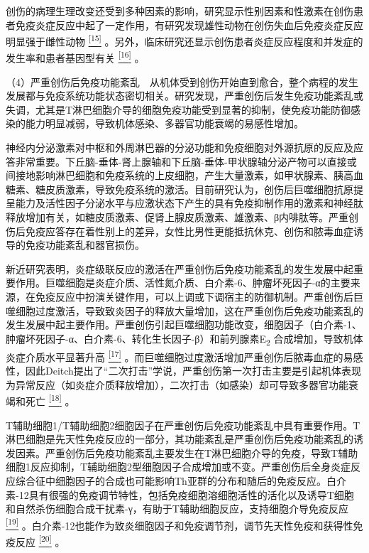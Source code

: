 创伤的病理生理改变还受到多种因素的影响，研究显示性别因素和性激素在创伤患者免疫炎症反应中起了一定作用，有研究发现雄性动物在创伤失血后免疫炎症反应明显强于雌性动物
\protect\hyperlink{text00024.htmlux5cux23ch15-23}{\textsuperscript{{[}15{]}}}
。另外，临床研究还显示创伤患者炎症反应程度和并发症的发生率和患者基因型有关
\protect\hyperlink{text00024.htmlux5cux23ch16-23}{\textsuperscript{{[}16{]}}}
。

（4）严重创伤后免疫功能紊乱　从机体受到创伤开始直到愈合，整个病程的发生发展都与免疫系统功能状态密切相关。研究发现，严重创伤后发生免疫功能紊乱或失调，尤其是T淋巴细胞介导的细胞免疫功能受到显著的抑制，使免疫功能防御感染的能力明显减弱，导致机体感染、多器官功能衰竭的易感性增加。

神经内分泌激素对中枢和外周淋巴器的分泌功能和免疫细胞对外源抗原的反应及应答非常重要。下丘脑-垂体-肾上腺轴和下丘脑-垂体-甲状腺轴分泌产物可以直接或间接地影响淋巴细胞和免疫系统的上皮细胞，产生大量激素，如甲状腺素、胰高血糖素、糖皮质激素，导致免疫系统的激活。目前研究认为，创伤后巨噬细胞抗原提呈能力及活性因子分泌水平与应激状态下产生的具有免疫抑制作用的激素和神经肽释放增加有关，如糖皮质激素、促肾上腺皮质激素、雄激素、β内啡肽等。严重创伤后免疫应答存在着性别上的差异，女性比男性更能抵抗休克、创伤和脓毒血症诱导的免疫功能紊乱和器官损伤。

新近研究表明，炎症级联反应的激活在严重创伤后免疫功能紊乱的发生发展中起重要作用。巨噬细胞是炎症介质、活性氮介质、白介素-6、肿瘤坏死因子-α的主要来源，在免疫反应中扮演关键作用，可以上调或下调宿主的防御机制。严重创伤后巨噬细胞过度激活，导致致炎因子的释放大量增加，这在严重创伤后免疫功能紊乱的发生发展中起主要作用。严重创伤引起巨噬细胞功能改变，细胞因子（白介素-1、肿瘤坏死因子-α、白介素-6、转化生长因子-β）和前列腺素E\textsubscript{2}
合成增加，导致机体炎症介质水平显著升高
\protect\hyperlink{text00024.htmlux5cux23ch17-23}{\textsuperscript{{[}17{]}}}
。而巨噬细胞过度激活增加严重创伤后脓毒血症的易感性，因此Deitch提出了“二次打击”学说，严重创伤第一次打击主要是引起机体表现为异常反应（如炎症介质释放增加），二次打击（如感染）却可导致多器官功能衰竭和死亡
\protect\hyperlink{text00024.htmlux5cux23ch18-23}{\textsuperscript{{[}18{]}}}
。

T辅助细胞1/T辅助细胞2细胞因子在严重创伤后免疫功能紊乱中具有重要作用。T淋巴细胞是先天性免疫反应的一部分，其功能紊乱是严重创伤后免疫功能紊乱的诱发因素。严重创伤后免疫功能紊乱主要发生在T淋巴细胞介导的免疫，导致T辅助细胞1反应抑制，T辅助细胞2型细胞因子合成增加或不变。严重创伤后全身炎症反应综合征中细胞因子的合成也可能影响Th亚群的分布和随后的免疫反应。白介素-12具有很强的免疫调节特性，包括免疫细胞溶细胞活性的活化以及诱导T细胞和自然杀伤细胞合成干扰素-γ，有助于T辅助细胞反应，支持细胞介导免疫反应
\protect\hyperlink{text00024.htmlux5cux23ch19-23}{\textsuperscript{{[}19{]}}}
。白介素-12也能作为致炎细胞因子和免疫调节剂，调节先天性免疫和获得性免疫反应
\protect\hyperlink{text00024.htmlux5cux23ch20-23}{\textsuperscript{{[}20{]}}}
。

